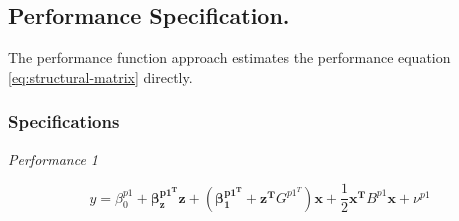 \documentclass[12pt]{article}
\begin{document}
% 
 
\subsection{Performance Specification.}
 
The performance function approach estimates the performance equation \eqref{eq:structural-matrix} directly. 

\subsubsection{Specifications}

\emph{Performance 1}
 
\begin{equation*}
    y = \beta_0^{p1} + \mathbf{\beta_z^{p1^T} z} + (\mathbf{\beta_1^{p1^T}} + \mathbf{z^T} G^{p1^T}) \mathbf{x} + 
    \frac{1}{2}\mathbf{x^T} B^{p1} \mathbf{x} + \nu^{p1}
\end{equation*}
\end{document}
